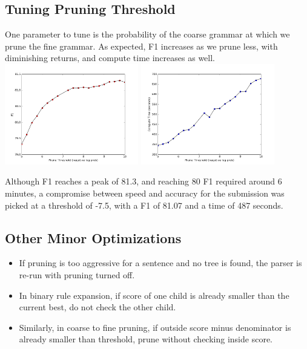 \documentclass[11pt]{article}
\begin{document}
\subsection{Tuning Pruning Threshold}
One parameter to tune is the probability of the coarse grammar at which
we prune the fine grammar. As expected, F1 increases as we prune less, with 
diminishing returns, and compute time increases as well.
\includegraphics[keepaspectratio=true, width=220px]{thresh_f1.png}
\includegraphics[keepaspectratio=true, width=220px]{thresh_time.png}

Although F1 reaches a peak of 81.3, and reaching 80 F1 required around 6 minutes, 
a compromise between speed and accuracy for the submission was
picked at a threshold of -7.5, with a F1 of 81.07 and a time of 487 seconds. 

\subsection{Other Minor Optimizations}
\begin{itemize}
\item If pruning is too aggressive for a sentence and no tree is found,
the parser is re-run with pruning turned off.
\item In binary rule expansion, if score of one child is already smaller than the current best,
do not check the other child.
\item Similarly, in coarse to fine pruning, if outside score minus denominator is already smaller
than threshold, prune without checking inside score.
\end{itemize}
\end{document}

